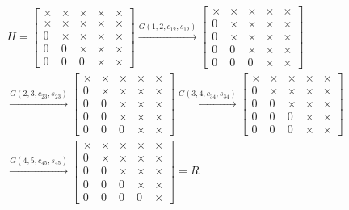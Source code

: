 \documentclass{beamer}
\providecommand{\brak}[1]{\ensuremath{\left(#1\right)}}
\theoremstyle{remark}
\numberwithin{equation}{section}
\begin{document}
\begin{frame}

\begin{multline}
H = \begin{bmatrix}
\times & \times & \times & \times & \times\\
\times & \times & \times & \times & \times\\
0 & \times & \times & \times & \times\\
0 & 0 & \times & \times & \times\\
0 & 0 & 0 & \times & \times
\end{bmatrix} \xrightarrow{G\brak{1, 2, c_{12}, s_{12}}}
\begin{bmatrix}
\times & \times & \times & \times & \times\\
0 & \times & \times & \times & \times\\
0 & \times & \times & \times & \times\\
0 & 0 & \times & \times & \times\\
0 & 0 & 0 & \times & \times
\end{bmatrix} \\\xrightarrow{G\brak{2, 3, c_{23}, s_{23}}}
\begin{bmatrix}
\times & \times & \times & \times & \times\\
0 & \times & \times & \times & \times\\
0 & 0 & \times & \times & \times\\
0 & 0 & \times & \times & \times\\
0 & 0 & 0 & \times & \times
\end{bmatrix} \xrightarrow{G\brak{3, 4, c_{34}, s_{34}}}
\begin{bmatrix}
\times & \times & \times & \times & \times\\
0 & \times & \times & \times & \times\\
0 & 0 & \times & \times & \times\\
0 & 0 & 0 & \times & \times\\
0 & 0 & 0 & \times & \times
\end{bmatrix} \\\xrightarrow{G\brak{4, 5, c_{45}, s_{45}}}
\begin{bmatrix}
\times & \times & \times & \times & \times\\
0 & \times & \times & \times & \times\\
0 & 0 & \times & \times & \times\\
0 & 0 & 0 & \times & \times\\
0 & 0 & 0 & 0 & \times
\end{bmatrix} = R
\end{multline}
\end{frame}
\end{document}

